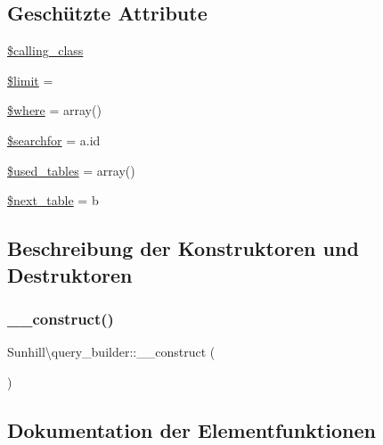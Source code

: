 \subsection*{Geschützte Attribute}
\begin{DoxyCompactItemize}
\item 
\hyperlink{classSunhill_1_1query__builder_a43f82b5b1941cc58a1e14ade5e53c0d3}{\$calling\+\_\+class}
\item 
\hyperlink{classSunhill_1_1query__builder_a998b2d93cd2d98046b795fc9f975737f}{\$limit} = \textquotesingle{}\textquotesingle{}
\item 
\hyperlink{classSunhill_1_1query__builder_ab602243ed5602d14dc8597e804814ca2}{\$where} = array()
\item 
\hyperlink{classSunhill_1_1query__builder_aa3742440f6031d5a6d32c420976964aa}{\$searchfor} = \textquotesingle{}a.\+id\textquotesingle{}
\item 
\hyperlink{classSunhill_1_1query__builder_addc80a42f99d07560bcdc29b8a31e309}{\$used\+\_\+tables} = array()
\item 
\hyperlink{classSunhill_1_1query__builder_ad898f7afa5d83e4437fc675ea92dc210}{\$next\+\_\+table} = \textquotesingle{}b\textquotesingle{}
\end{DoxyCompactItemize}


\subsection{Beschreibung der Konstruktoren und Destruktoren}
\mbox{\label{classSunhill_1_1query__builder_a518103039d35b27e746b3fab81ba2eac}} 
\subsubsection{\texorpdfstring{\+\_\+\+\_\+construct()}{\_\_construct()}}
{\footnotesize\ttfamily Sunhill\textbackslash{}query\+\_\+builder\+::\+\_\+\+\_\+construct (\begin{DoxyParamCaption}{ }\end{DoxyParamCaption})}



\subsection{Dokumentation der Elementfunktionen}
\mbox{\label{classSunhill_1_1query__builder_aeebb99255857d8ffb7e2178a39da7cdd}} 
